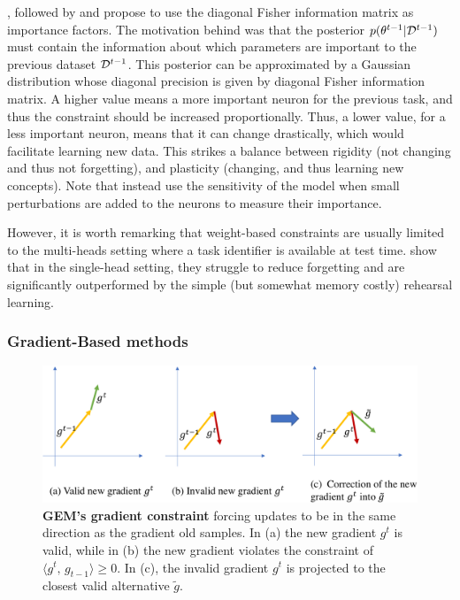 \cite{kirkpatrick2017ewc}, followed by \cite{zenke2017synaptic_intelligence} and
\cite{chaudhry2018riemannien_walk} propose to use the diagonal Fisher information matrix as
importance factors. The motivation behind was that the posterior $p(\theta^{t-1} | \mathcal{D}^{t-1})$ must
contain the information about which parameters are important to the previous dataset $\mathcal{D}^{t-1}$.
This posterior can be approximated by a Gaussian distribution whose diagonal precision is given by
diagonal Fisher information matrix. A higher value means a more important neuron for the previous
task, and thus the constraint should be increased proportionally. Thus, a lower value, for a less
important neuron, means that it can change drastically, which would facilitate learning new data.
This strikes a balance between rigidity (not changing and thus not forgetting), and plasticity
(changing, and thus learning new concepts). Note that \cite{aljundi2018MemoryAwareSynapses} instead
use the sensitivity of the model when small perturbations are added to the neurons to measure their
importance.

However, it is worth remarking that weight-based constraints are usually limited to the multi-heads
setting where a task identifier is available at test time. \cite{lesort2019regulshortcomings} show
that in the single-head setting, they struggle to reduce forgetting and are significantly
outperformed by the simple (but somewhat memory costly) rehearsal learning.

\subsubsection{Gradient-Based methods}
\label{sec:related_regul_gradient}

\begin{figure}[tb]
      \begin{center}
            \includegraphics[width=1.0\linewidth]{images/related/gem.pdf}
      \end{center}
      \caption{\textbf{GEM's gradient constraint} forcing updates to be in the same direction as the
            gradient \wrt old samples. In (a) the new gradient $g^t$ is valid, while in (b) the new gradient
            violates the constraint of $\langle g^t,\, g_{t-1}\rangle \ge 0$. In (c), the invalid gradient
            $g^t$ is projected to the closest valid alternative $\tilde{g}$.}
      \label{fig:related_gem}
\end{figure}

